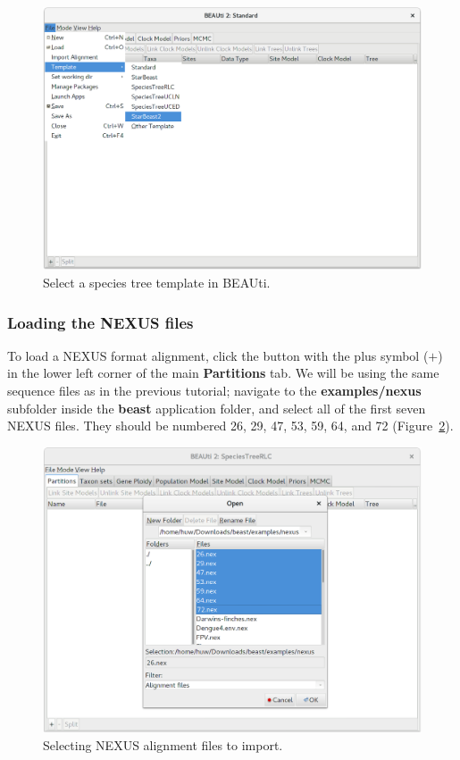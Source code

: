\documentclass{article}
\begin{document}
\begin{figure}[htb!]
\centering
\includegraphics[width=\textwidth]{figures/beauti-strict.png}
\caption{Select a species tree template in BEAUti.}
\label{fig:sb2Template}
\end{figure}

\clearpage

\subsubsection*{Loading the NEXUS files}

To load a NEXUS format alignment, click the button with the plus symbol ($+$) in
the lower left corner of the main \textbf{Partitions} tab. We will be using the
same sequence files as in the previous tutorial;
navigate to the \textbf{examples/nexus} subfolder inside the \textbf{beast}
application folder, and select all of the first seven NEXUS files. They should
be numbered 26, 29, 47, 53, 59, 64, and 72 (Figure~\ref{fig:importAlignments}).

\begin{figure}[htb!]
\centering
\includegraphics[width=\textwidth]{figures/beauti-import.png}
\caption{Selecting NEXUS alignment files to import.}
\label{fig:importAlignments}
\end{figure}
\end{document}
